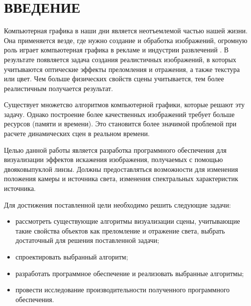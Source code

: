 \section*{ВВЕДЕНИЕ}

Компьютерная графика в наши дни является неотъемлемой частью нашей жизни. Она применяется везде, где нужно создание и обработка изображений, огромную роль
играет компьютерная графика в рекламе и индустрии развлечений \cite{boreskov_cg}. В результате появляется задача создания реалистичных изображений, в которых учитываются оптические эффекты преломления и отражения, а также текстура или цвет. Чем больше физических свойств сцены учитывается, тем более реалистичным получается результат.

Существует множетсво алгоритмов компьютерной графики, которые решают эту задачу. Однако построение более качественных изображений требует больше ресурсов (памяти и времени). Это становится более значимой проблемой при расчете динамических сцен в реальном времени.

Целью данной работы является разработка программного обеспечения для визуализации эффектов искажения изображения, получаемых с помощью двояковыпуклой линзы. Должны предоставляться возможности для изменения положения камеры и источника света, изменения спектральных характеристик источника.

Для достижения поставленной цели необходимо решить следующие задачи:

\begin{itemize}
	\item рассмотреть существующие алгоритмы визуализации сцены, учитывающие такие свойства объектов как преломление и отражение света, выбрать достаточный для решения поставленной задачи;
	\item спроектировать выбранный алгоритм;
	\item разработать программное обеспечение и реализовать выбранные алгоритмы;
	\item провести исследование производительности полученного программного обеспечения.
\end{itemize}

\clearpage

